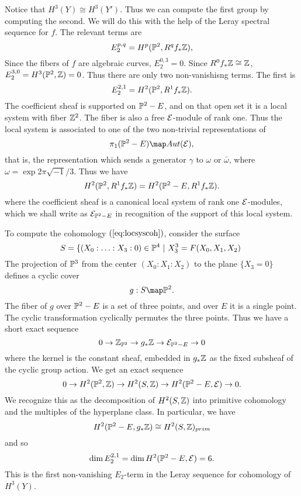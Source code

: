 Notice that $H^3(Y) \cong H^3(Y')$. Thus we can compute the first group by computing
the second. We will do this with the help of the Leray spectral sequence for $f$. The
relevant terms are \[ E_2^{p,q} = H^p({ \mathbb P }^2, R^qf_*{ \mathbb Z }), \] Since the fibers of $f$ are
algebraic curves, $E_2^{0,3} = 0$. Since $R^0f_*{ \mathbb Z } \cong { \mathbb Z }$, $E_2^{3,0} = H^3({ \mathbb P }^2,
{ \mathbb Z }) = 0$. Thus there are only two non-vanishisng terms. The first is \begin{equation}
\label{leray21} E_2^{2,1} = H^2({ \mathbb P }^2, R^1f_*{ \mathbb Z }). \end{equation} The coefficient sheaf
is supported on ${ \mathbb P }^2 - E$, and on that open set it is a local system with fiber
${ \mathbb Z }^2$. The fiber is also a free ${ \mathcal E }$-module of rank one. Thus the local system is
associated to one of the two non-trivial representations of \[ \pi_1(\PP^2 - E) \map
Aut(\EEE), \] that is, the representation which sends a generator $\gamma$ to $\omega$
or $\bar\omega$, where $\omega = \exp 2\pi \sqrt{-1}/3$. Thus we have \begin{equation}
\label{eq:locsyscoh} H^2({ \mathbb P }^2, R^1f_*{ \mathbb Z }) = H^2({ \mathbb P }^2 - E, R^1f_*{ \mathbb Z }). \end{equation}
where the coefficient sheaf is a canonical local system of rank one ${ \mathcal E }$-modules,
which we shall write as ${ \mathcal E }_{{ \mathbb P }^2 - E}$ in recognition of the support of this local
system.

To compute the cohomology $(\ref{eq:locsyscoh})$, consider the surface \[ S =
\{ (X_0: \ldots : X_3:0) \in { \mathbb P }^4\ |\ X_3^3 = F(X_0,X_1,X_2)\  \] The projection of
${ \mathbb P }^3$ from the center $(X_0 : X_1 : X_2)$ to the plane $\{X_3=0\}$ defines a cyclic
cover \[ g: S \map \PP^2. \] The fiber of $g$ over ${ \mathbb P }^2 - E$ is a set of three
points, and over $E$ it is a single point. The cyclic transformation cyclically
permutes the three points. Thus we have a short exact sequence \[ 0 \to { \mathbb Z }_{{ \mathbb P }^2}\to
g_*{ \mathbb Z } \to { \mathcal E }_{{ \mathbb P }^2 - E} \to 0 \] where the kernel is the constant sheaf, embedded
in $g_*{ \mathbb Z } $ as the fixed subsheaf of the cyclic group action. We get an exact sequence
\[ 0 \to H^2({ \mathbb P }^2, { \mathbb Z }) \to H^2(S, { \mathbb Z }) \to H^2({ \mathbb P }^2 - E, { \mathcal E }) \to 0. \] We
recognize this as the decomposition of $H^2(S,{ \mathbb Z })$ into primitive cohomology and the
multiples of the hyperplane class. In particular, we have \[ H^2({ \mathbb P }^2 - E, g_*{ \mathbb Z })
\cong H^2(S,{ \mathbb Z })_{prim} \] and so \begin{equation} \label{rankleray21} \dim E_2^{2,1} =
\dim H^2({ \mathbb P }^2 - E, { \mathcal E }) = 6. \end{equation} This is the first non-vanishing
$E_2$-term in the Leray sequence for cohomology of $H^3(Y)$.

